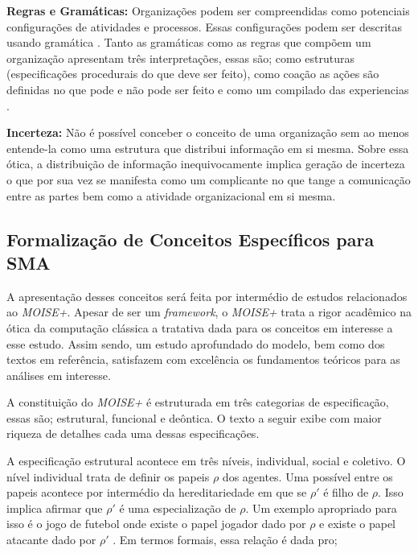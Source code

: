 \textbf{Regras e Gramáticas:} Organizações podem ser compreendidas como potenciais configurações de atividades e processos. Essas configurações podem ser descritas usando gramática \cite{grammarselforganizationmodel} \cite{grammarselforganizationmodel2}. Tanto as gramáticas como as regras que compõem um organização apresentam três interpretações, essas são; como estruturas (especificações procedurais do que deve ser feito), como coação as ações são definidas no que pode e não pode ser feito e como um compilado das experiencias \cite{organiationofmultiagentsystem}.

\textbf{Incerteza:} Não é possível conceber o conceito de uma organização sem ao menos entende-la como uma estrutura que distribui informação em si mesma. Sobre essa ótica, a distribuição de informação inequivocamente implica geração de incerteza o que por sua vez se manifesta como um complicante no que tange a comunicação entre as partes bem como a atividade organizacional em si mesma.

\subsection{Formalização de Conceitos Específicos para SMA}
\label{moiseformalizesma}
A apresentação desses conceitos será feita por intermédio de estudos relacionados ao \textit{MOISE+}. Apesar de ser um \textit{framework}, o \textit{MOISE+} trata a rigor acadêmico na ótica da computação clássica a tratativa dada para os conceitos em interesse a esse estudo. Assim sendo, um estudo aprofundado do modelo, bem como dos textos em referência, satisfazem com excelência os fundamentos teóricos para as análises em interesse. 

A constituição do \textit{MOISE+} é estruturada em três categorias de especificação, essas são; estrutural, funcional e deôntica. O texto a seguir exibe com maior riqueza de detalhes cada uma dessas especificações.  

A especificação estrutural acontece em três níveis, individual, social e coletivo. O nível individual trata de definir os papeis $\rho$ dos agentes. Uma possível entre os papeis acontece por 
intermédio da hereditariedade em que se $\rho'$ é filho de $\rho$. Isso implica afirmar que $\rho'$ é uma especialização de $\rho$. Um exemplo apropriado para isso é o jogo de futebol onde 
existe o papel jogador dado por $\rho$ e existe o papel atacante dado por $\rho'$ \cite{moiseframework} \cite{roleone} \cite{roletwo} \cite{dynamicagenttemporalstruct}. Em termos formais, essa relação é dada pro; 

